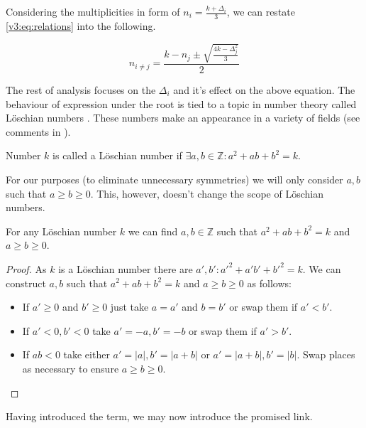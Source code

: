     Considering the multiplicities in form of $n_i = \frac{k+\Delta_i}{3}$, we can restate \eqref{v3:eq:relations} into the following.

    \begin{equation}
        \label{v3:eq:relations_delta}
        n_{i\neq j} = \frac{k-n_j \pm \sqrt{\frac{4k-\Delta_j^2}{3}}}{2}
    \end{equation}

    The rest of analysis focuses on the $\Delta_i$ and it's effect on the above equation. The behaviour of expression under the root is tied to a topic in number theory called Löschian numbers \cite{oeisA003136}. These numbers make an appearance in a variety of fields (see comments in \cite{oeisA003136}).

    \begin{definition}
        \label{v3:def:loeshian}
        Number $k$ is called a Löschian number if $\exists a,b \in \mathbb Z \colon a^2+ab+b^2=k$.
    \end{definition}

    For our purposes (to eliminate unnecessary symmetries) we will only consider $a,b$ such that $a \geq b \geq 0$. This, however, doesn't change the scope of Löschian numbers.

    \begin{lemma}
        \label{v3:lemma:loeschian}
        For any Löschian number $k$ we can find $a,b \in \mathbb Z$ such that $a^2+ab+b^2=k$ and $a \geq b \geq 0$.
    \end{lemma}

    \begin{proof}
        As $k$ is a Löschian number there are $a',b' \colon a'^2+a'b'+b'^2=k$. We can construct $a,b$ such that $a^2+ab+b^2=k$ and $a \geq b \geq 0$ as follows:
        \begin{itemize}
            \item If $a' \geq 0$ and $b' \geq 0$ just take $a=a'$ and $b=b'$ or swap them if $a'<b'$.
            \item If $a'<0,b'<0$ take $a'=-a,b'=-b$ or swap them if $a'>b'$.
            \item If $ab<0$ take either $a'=|a|, b'=|a+b|$ or $a'=|a+b|, b'=|b|$. Swap places as necessary to ensure $a \geq b \geq 0$.
        \end{itemize}
    \end{proof}

    Having introduced the term, we may now introduce the promised link.

